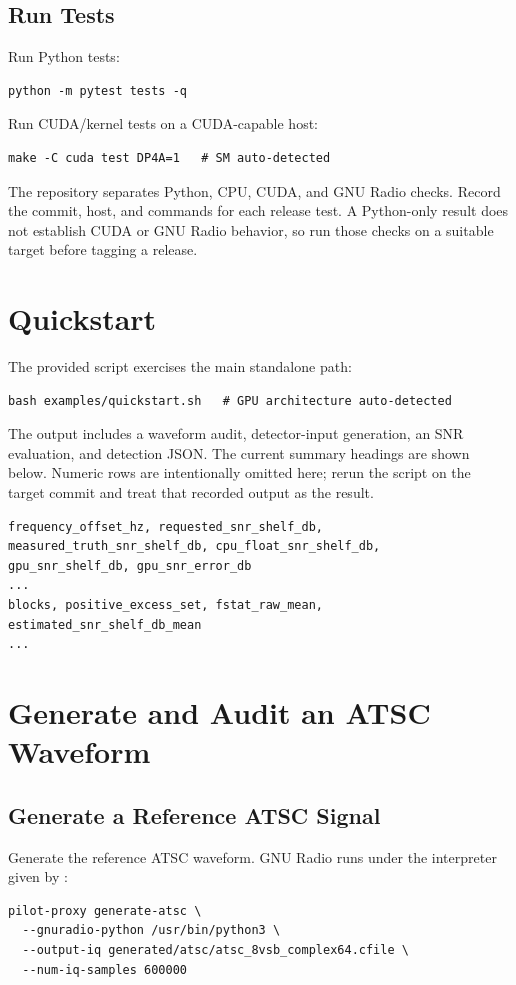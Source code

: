 \documentclass[10pt,letterpaper]{article}
\newcommand{\code}[1]{\texttt{\detokenize{#1}}}
\begin{document}
\subsection{Run Tests}

Run Python tests:
\begin{lstlisting}[style=shell]
python -m pytest tests -q
\end{lstlisting}
Run CUDA/kernel tests on a CUDA-capable host:
\begin{lstlisting}[style=shell]
make -C cuda test DP4A=1   # SM auto-detected
\end{lstlisting}
The repository separates Python, CPU, CUDA, and GNU Radio checks. Record the commit, host, and commands for each release test. A Python-only result does not establish CUDA or GNU Radio behavior, so run those checks on a suitable target before tagging a release.

\section{Quickstart}

The provided script exercises the main standalone path:
\begin{lstlisting}[style=shell]
bash examples/quickstart.sh   # GPU architecture auto-detected
\end{lstlisting}
The output includes a waveform audit, detector-input generation, an SNR evaluation, and detection JSON. The current summary headings are shown below. Numeric rows are intentionally omitted here; rerun the script on the target commit and treat that recorded output as the result.
\begin{lstlisting}[style=shell]
frequency_offset_hz, requested_snr_shelf_db,
measured_truth_snr_shelf_db, cpu_float_snr_shelf_db,
gpu_snr_shelf_db, gpu_snr_error_db
...
blocks, positive_excess_set, fstat_raw_mean,
estimated_snr_shelf_db_mean
...
\end{lstlisting}

\section{Generate and Audit an ATSC Waveform}

\subsection{Generate a Reference ATSC Signal}

Generate the reference ATSC waveform. GNU Radio runs under the interpreter given by \code{--gnuradio-python}:
\begin{lstlisting}[style=shell]
pilot-proxy generate-atsc \
  --gnuradio-python /usr/bin/python3 \
  --output-iq generated/atsc/atsc_8vsb_complex64.cfile \
  --num-iq-samples 600000
\end{lstlisting}
\end{document}
